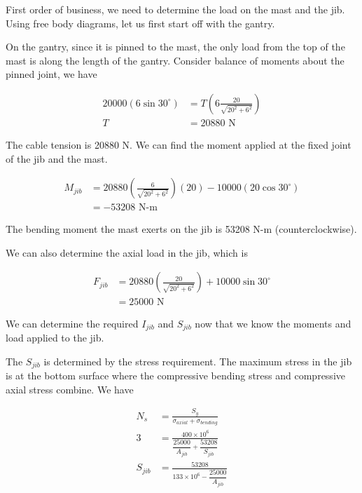 \documentclass[
10pt,
a4paper,
openany,
svgnames,
]{book}
\begin{document}
\begin{solution}

  First order of business, we need to determine the load on the mast and the jib. Using free body diagrams, let us first start off with the gantry.
  
  On the gantry, since it is pinned to the mast, the only load from the top of the mast is along the length of the gantry. Consider balance of moments about the pinned joint, we have
  
  \begin{align*}
    20000(6 \sin 30^{\circ}) &= T \left( 6 \frac{20}{\sqrt{ 20^2 +6^2 }} \right) \\
    T &= 20880 \text{ N}
  \end{align*}

  The cable tension is 20880 N. We can find the moment applied at the fixed joint of the jib and the mast.
  
  \begin{align*}
    M_{jib} &= 20880 \left( \frac{6}{\sqrt{20^2 + 6^2}} \right) (20) - 10000(20 \cos 30^{\circ}) \\
            &= -53208 \text{ N-m}
  \end{align*}
  
  The bending moment the mast exerts on the jib is 53208 N-m (counterclockwise).
  
  We can also determine the axial load in the jib, which is

  \begin{align*}
    F_{jib} &= 20880 \left( \frac{20}{\sqrt{20^2 + 6^2}} \right) + 10000 \sin 30^{\circ} \\
            &= 25000 \text{ N}
  \end{align*}
  
  We can determine the required $I_{jib}$ and $S_{jib}$ now that we know the moments and load applied to the jib.
  
  The $S_{jib}$ is determined by the stress requirement. The maximum stress in the jib is at the bottom surface where the compressive bending stress and compressive axial stress combine. We have
  
  \begin{align*}
    N_s &= \frac{S_y}{\sigma_{axial} + \sigma_{bending}} \\
    3 &= \frac{400 \times 10^6}{\dfrac{25000}{A_{jib}} + \dfrac{53208}{S_{jib}}} \\[1ex]
    S_{jib} &= \frac{53208}{133 \times 10^6 - \dfrac{25000}{A_{jib}}}
  \end{align*}


\end{solution}
\end{document}
